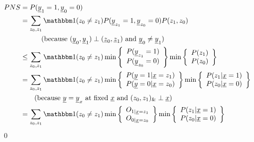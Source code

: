 \begin{align}
PNS&= P(\rvy_1=1, \rvy_0=0)
\\
&=
\sum_{z_0, z_1}\indi(z_0\neq z_1)
P(\rvy_{z_1}=1, \rvy_{z_0}=0)P(z_1, z_0)
\\
&\quad\quad \nonumber 
\text{\quad (because $(\rvy_0, \rvy_1)\perp
 (\rvz_0, \rvz_1)$ and $\rvy_0\neq \rvy_1$)} 
\\
&\leq
\sum_{z_0, z_1}\indi(z_0\neq z_1)
\min\left\{\begin{array}{l}
P(\rvy_{z_1}=1)\\
P(\rvy_{z_0}=0)
\end{array}
\right\}
\min\left\{\begin{array}{l}
P(z_1)
\\
P(z_0)
\end{array}
\right\}
\\
&=
\sum_{z_0, z_1}\indi(z_0\neq z_1)
\min\left\{\begin{array}{l}
P(\rvy=1|\rvx=z_1)\\
P(\rvy=0|\rvx=z_0)
\end{array}
\right\}
\min\left\{\begin{array}{l}
P(z_1|\rvx=1)
\\
P(z_0|\rvx=0)
\end{array}
\right\}
\\
&\quad\quad \nonumber
\text{(because $\rvy=\rvy_x$ at fixed $\rvx$ 
and $(z_0, z_1)_\&\perp \rvx$)}
\\
&=
\sum_{z_0, z_1}
\indi(z_0\neq z_1)
\min
\left\{\begin{array}{l}
O_{1|\rvx=z_1}\\
 O_{0|\rvx=z_0}
\end{array}\right\}
\min
\left\{\begin{array}{l}
P(z_1| \rvx=1)
\\
P(z_0| \rvx=0)
\end{array}\right\}
\end{align}
\qed